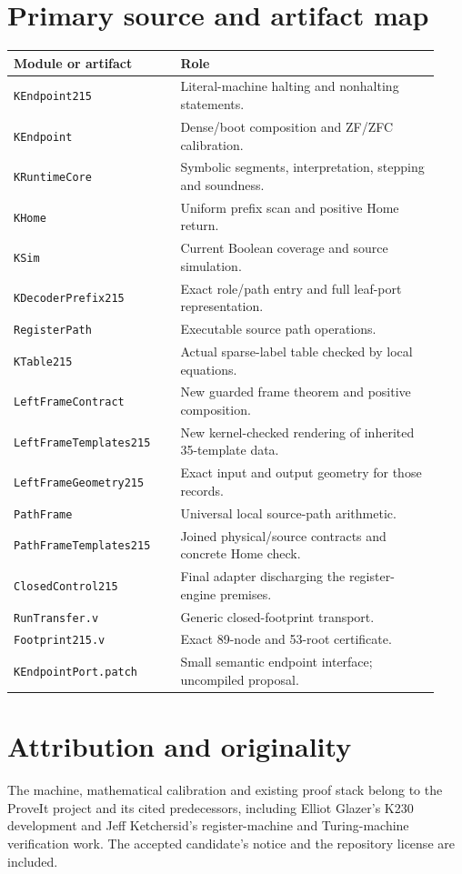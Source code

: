 \section{Primary source and artifact map}
\begin{longtable}{@{}p{0.36\linewidth}p{0.57\linewidth}@{}}
\toprule Module or artifact & Role\\\midrule
\endhead
\texttt{KEndpoint215} & Literal-machine halting and nonhalting statements.\\
\texttt{KEndpoint} & Dense/boot composition and ZF/ZFC calibration.\\
\texttt{KRuntimeCore} & Symbolic segments, interpretation, stepping and soundness.\\
\texttt{KHome} & Uniform prefix scan and positive Home return.\\
\texttt{KSim} & Current Boolean coverage and source simulation.\\
\texttt{KDecoderPrefix215} & Exact role/path entry and full leaf-port representation.\\
\texttt{RegisterPath} & Executable source path operations.\\
\texttt{KTable215} & Actual sparse-label table checked by local equations.\\
\texttt{LeftFrameContract} & New guarded frame theorem and positive composition.\\
\texttt{LeftFrameTemplates215} & New kernel-checked rendering of inherited 35-template data.\\
\texttt{LeftFrameGeometry215} & Exact input and output geometry for those records.\\
\texttt{PathFrame} & Universal local source-path arithmetic.\\
\texttt{PathFrameTemplates215} & Joined physical/source contracts and concrete Home check.\\
\texttt{ClosedControl215} & Final adapter discharging the register-engine premises.\\
\texttt{RunTransfer.v} & Generic closed-footprint transport.\\
\texttt{Footprint215.v} & Exact 89-node and 53-root certificate.\\
\texttt{KEndpointPort.patch} & Small semantic endpoint interface; uncompiled proposal.\\
\bottomrule
\end{longtable}

\section{Attribution and originality}
The machine, mathematical calibration and existing proof stack belong to the ProveIt project and its cited predecessors, including Elliot Glazer's K230 development and Jeff Ketchersid's register-machine and Turing-machine verification work. The accepted candidate's notice and the repository license are included.

